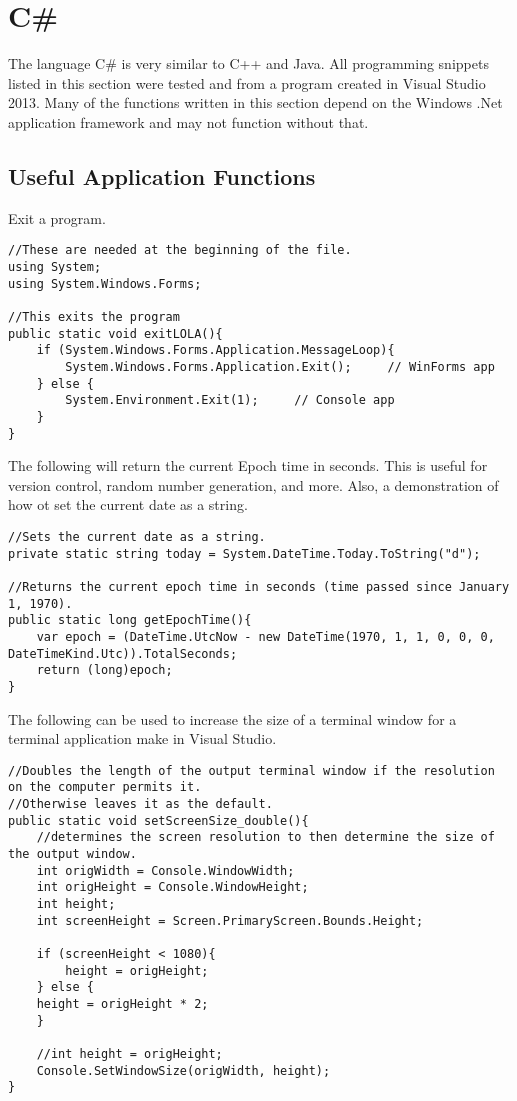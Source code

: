 \chapter{C\#}
\thispagestyle{fancy}
\lstset{language=[Sharp]C, style=sharpc}

The language C\# is very similar to C++ and Java. All programming snippets listed in this section were tested and from a program created in Visual Studio 2013. Many of the functions written in this section depend on the Windows .Net application framework and may not function without that.

\section{Useful Application Functions}

Exit a program.
\begin{lstlisting}
//These are needed at the beginning of the file.
using System;
using System.Windows.Forms;

//This exits the program
public static void exitLOLA(){
	if (System.Windows.Forms.Application.MessageLoop){
		System.Windows.Forms.Application.Exit();     // WinForms app
	} else {
		System.Environment.Exit(1);     // Console app
	}
}
\end{lstlisting} 

The following will return the current Epoch time in seconds. This is useful for version control, random number generation, and more. Also, a demonstration of how ot set the current date as a string.
\begin{lstlisting}
//Sets the current date as a string.
private static string today = System.DateTime.Today.ToString("d");

//Returns the current epoch time in seconds (time passed since January 1, 1970).
public static long getEpochTime(){
	var epoch = (DateTime.UtcNow - new DateTime(1970, 1, 1, 0, 0, 0, DateTimeKind.Utc)).TotalSeconds;
	return (long)epoch;
}
\end{lstlisting}

The following can be used to increase the size of a terminal window for a terminal application make in Visual Studio.
\begin{lstlisting}
//Doubles the length of the output terminal window if the resolution on the computer permits it.
//Otherwise leaves it as the default.
public static void setScreenSize_double(){
	//determines the screen resolution to then determine the size of the output window.
	int origWidth = Console.WindowWidth;
	int origHeight = Console.WindowHeight;
	int height;
	int screenHeight = Screen.PrimaryScreen.Bounds.Height;
	
	if (screenHeight < 1080){
		height = origHeight;
	} else {
	height = origHeight * 2;
	}
	
	//int height = origHeight;
	Console.SetWindowSize(origWidth, height);       
}
\end{lstlisting}

